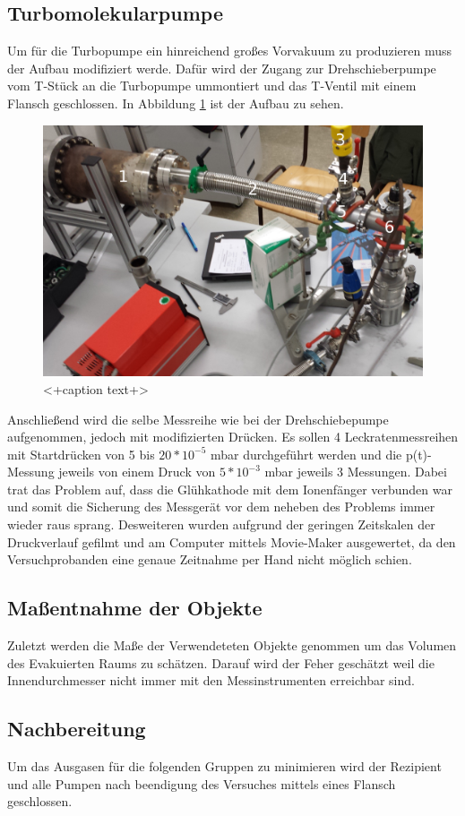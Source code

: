 \subsection{Turbomolekularpumpe}
Um für die Turbopumpe ein hinreichend großes Vorvakuum zu produzieren muss der Aufbau modifiziert werde. Dafür wird der Zugang zur Drehschieberpumpe vom T-Stück an die Turbopumpe ummontiert und das T-Ventil mit einem Flansch geschlossen. In Abbildung \ref{fig:Turbo} ist der Aufbau zu sehen. 
\begin{figure}[htpb]
  \centering
  \includegraphics[width=\textwidth]{picture/Aufgabe2.jpg}
  \caption{<+caption text+>}
  \label{fig:Turbo}
\end{figure}
Anschließend wird die selbe Messreihe wie bei der Drehschiebepumpe aufgenommen, jedoch mit modifizierten Drücken. Es sollen 4 Leckratenmessreihen mit Startdrücken von 5 bis $20*10^{-5}$ mbar durchgeführt werden und die p(t)-Messung jeweils von einem Druck von $5*10^{-3}$ mbar jeweils 3 Messungen. Dabei trat das Problem auf, dass die Glühkathode mit dem Ionenfänger verbunden war und somit die Sicherung des Messgerät vor dem neheben des Problems immer wieder raus sprang. Desweiteren wurden aufgrund der geringen Zeitskalen der Druckverlauf gefilmt und am Computer mittels Movie-Maker ausgewertet, da den Versuchprobanden eine genaue Zeitnahme per Hand nicht möglich schien.
\subsection{Maßentnahme der Objekte}
Zuletzt werden die Maße der Verwendeteten Objekte genommen um das Volumen des Evakuierten Raums zu schätzen. Darauf wird der Feher geschätzt weil die Innendurchmesser nicht immer mit den Messinstrumenten erreichbar sind.
\subsection{Nachbereitung}
Um das Ausgasen für die folgenden Gruppen zu minimieren wird der Rezipient und alle Pumpen nach beendigung des Versuches mittels eines Flansch geschlossen. 
